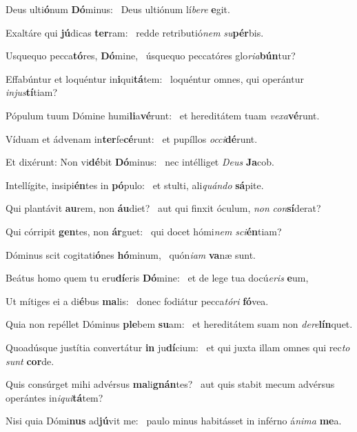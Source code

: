 \item Deus ulti\textbf{ó}num \textbf{Dó}minus:~\psstar{} Deus ultiónum lí\textit{bere} \textbf{e}git.
\item Exaltáre qui \textbf{jú}dicas \textbf{ter}ram:~\psstar{} redde retributió\textit{nem} \textit{su}\textbf{pér}bis.
\item Usquequo pecca\textbf{tó}res, \textbf{Dó}mine,~\psstar{} úsquequo peccatóres glo\textit{ria}\textbf{bún}tur?
\item Effabúntur et loquéntur in\textbf{i}qui\textbf{tá}tem:~\psstar{} loquéntur omnes, qui operántur \textit{injus}\textbf{tí}tiam?
\item Pópulum tuum Dómine humi\textbf{li}a\textbf{vé}runt:~\psstar{} et hereditátem tuam \textit{vexa}\textbf{vé}runt.
\item Víduam et ádvenam in\textbf{ter}fe\-\textbf{cé}runt:~\psstar{} et pupíllos \textit{occi}\textbf{dé}runt.
\item Et dixérunt: Non vi\textbf{dé}bit \textbf{Dó}minus:~\psstar{} nec intélliget \textit{Deus} \textbf{Ja}cob.
\item Intellígite, insipi\textbf{én}tes in \textbf{pó}pulo:~\psstar{} et stulti, ali\textit{quándo} \textbf{sá}pite.
\item Qui plantávit \textbf{au}rem, non \textbf{áu}diet?~\psstar{} aut qui finxit óculum, \textit{non} \textit{con}\textbf{sí}derat?
\item Qui córripit \textbf{gen}tes, non \textbf{ár}guet:~\psstar{} qui docet hómi\textit{nem} \textit{sci}\textbf{én}tiam?
\item Dóminus scit cogitati\textbf{ó}nes \textbf{hó}minum,~\psstar{} quón\textit{iam} \textbf{va}næ sunt.
\item Beátus homo quem tu eru\textbf{dí}eris \textbf{Dó}mine:~\psstar{} et de lege tua docú\textit{eris} \textbf{e}um,
\item Ut mítiges ei a di\textbf{é}bus \textbf{ma}lis:~\psstar{} donec fodiátur pecca\textit{tóri} \textbf{fó}vea.
\item Quia non repéllet Dóminus \textbf{ple}bem \textbf{su}am:~\psstar{} et hereditátem suam non \textit{dere}\textbf{lín}quet.
\item Quoadúsque justítia convertátur \textbf{in} ju\textbf{dí}cium:~\psstar{} et qui juxta illam omnes qui rec\textit{to} \textit{sunt} \textbf{cor}de.
\item Quis consúrget mihi advérsus \textbf{ma}li\textbf{gnán}tes?~\psstar{} aut quis stabit mecum advérsus operántes in\textit{iqui}\textbf{tá}tem?
\item Nisi quia Dómi\textbf{nus} ad\textbf{jú}vit me:~\psstar{} paulo minus habitásset in inférno á\textit{nima} \textbf{me}a.
